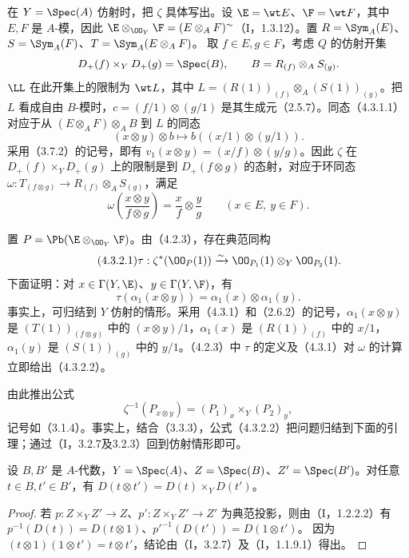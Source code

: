 在 $Y=\Spec(A)$ 仿射时，把 $\zeta$ 具体写出。设 $\E=\wt E$、$\F=\wt F$，其中 $E,F$ 是 $A$-模，因此
$\E\otimes_{\OO_Y}\F=(E\otimes_A F)^\sim$（I，1.3.12）。置
$R=\Sym_A(E)$、$S=\Sym_A(F)$、$T=\Sym_A(E\otimes_A F)$。
取 $f\in E,g\in F$，考虑 $Q$ 的仿射开集
\[
D_+(f)\times_Y D_+(g)=\Spec(B),\qquad B=R_{(f)}\otimes_A S_{(g)}.
\]
$\LL$ 在此开集上的限制为 $\wt L$，其中
$L=(R(1))_{(f)}\otimes_A(S(1))_{(g)}$。把 $L$ 看成自由 $B$-模时，$c=(f/1)\otimes(g/1)$ 是其生成元（2.5.7）。同态（4.3.1.1）对应于从 $(E\otimes_A F)\otimes_A B$ 到 $L$ 的同态
\[
(x\otimes y)\otimes b\longmapsto b((x/1)\otimes(y/1)).
\]
采用（3.7.2）的记号，即有 $v_1(x\otimes y)=(x/f)\otimes(y/g)$。因此 $\zeta$ 在 $D_+(f)\times_YD_+(g)$ 上的限制是到 $D_+(f\otimes g)$ 的态射，对应于环同态
$\omega:T_{(f\otimes g)}\to R_{(f)}\otimes_A S_{(g)}$，满足
\begin{equation}\tag{4.3.1.3}
\omega\left(\frac{x\otimes y}{f\otimes g}\right)=\frac{x}{f}\otimes\frac{y}{g}
\qquad(x\in E,\ y\in F).
\end{equation}

置 $P=\Pb(\E\otimes_{\OO_Y}\F)$。由（4.2.3），存在典范同构
\begin{equation}\tag{4.3.2.1}
\tau:\zeta^*(\OO_P(1))\xrightarrow{\sim}\OO_{P_1}(1)\otimes_Y\OO_{P_2}(1).
\end{equation}
下面证明：对 $x\in\Gamma(Y,\E)$、$y\in\Gamma(Y,\F)$，有
\begin{equation}\tag{4.3.2.2}\tau(\alpha_1(x\otimes y))=\alpha_1(x)\otimes\alpha_1(y).\end{equation}
事实上，可归结到 $Y$ 仿射的情形。采用（4.3.1）和（2.6.2）的记号，$\alpha_1(x\otimes y)$ 是 $(T(1))_{(f\otimes g)}$ 中的 $(x\otimes y)/1$，$\alpha_1(x)$ 是 $(R(1))_{(f)}$ 中的 $x/1$，$\alpha_1(y)$ 是 $(S(1))_{(g)}$ 中的 $y/1$。（4.2.3）中 $\tau$ 的定义及（4.3.1）对 $\omega$ 的计算立即给出（4.3.2.2）。

由此推出公式
\begin{equation}\tag{4.3.2.3}\zeta^{-1}(P_{x\otimes y})=(P_1)_x\times_Y(P_2)_y,\end{equation}
记号如（3.1.4）。事实上，结合（3.3.3），公式（4.3.2.2）把问题归结到下面的引理；通过（I，3.2.7及3.2.3）回到仿射情形即可。

设 $B,B'$ 是 $A$-代数，$Y=\Spec(A)$、$Z=\Spec(B)$、$Z'=\Spec(B')$。对任意 $t\in B,t'\in B'$，有
$D(t\otimes t')=D(t)\times_Y D(t')$。
\begin{proof}
若 $p:Z\times_Y Z'\to Z$、$p':Z\times_Y Z'\to Z'$ 为典范投影，则由（I，1.2.2.2）有
$p^{-1}(D(t))=D(t\otimes1)$、$p'^{-1}(D(t'))=D(1\otimes t')$。
因为 $(t\otimes1)(1\otimes t')=t\otimes t'$，结论由（I，3.2.7）及（I，1.1.9.1）得出。
\end{proof}

